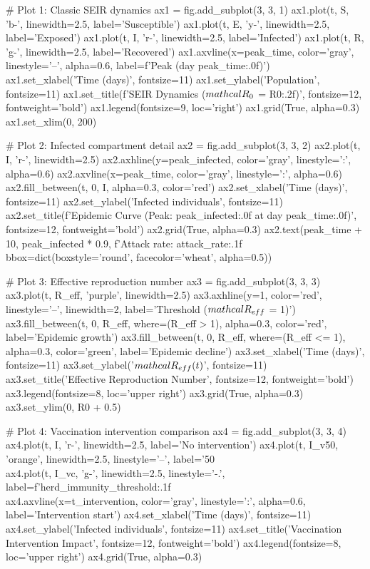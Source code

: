 \documentclass[a4paper, 11pt]{article}
\begin{document}
\begin{pycode}
# Plot 1: Classic SEIR dynamics
ax1 = fig.add_subplot(3, 3, 1)
ax1.plot(t, S, 'b-', linewidth=2.5, label='Susceptible')
ax1.plot(t, E, 'y-', linewidth=2.5, label='Exposed')
ax1.plot(t, I, 'r-', linewidth=2.5, label='Infected')
ax1.plot(t, R, 'g-', linewidth=2.5, label='Recovered')
ax1.axvline(x=peak_time, color='gray', linestyle='--', alpha=0.6, label=f'Peak (day {peak_time:.0f})')
ax1.set_xlabel('Time (days)', fontsize=11)
ax1.set_ylabel('Population', fontsize=11)
ax1.set_title(f'SEIR Dynamics ($\\mathcal{{R}}_0$ = {R0:.2f})', fontsize=12, fontweight='bold')
ax1.legend(fontsize=9, loc='right')
ax1.grid(True, alpha=0.3)
ax1.set_xlim(0, 200)

# Plot 2: Infected compartment detail
ax2 = fig.add_subplot(3, 3, 2)
ax2.plot(t, I, 'r-', linewidth=2.5)
ax2.axhline(y=peak_infected, color='gray', linestyle=':', alpha=0.6)
ax2.axvline(x=peak_time, color='gray', linestyle=':', alpha=0.6)
ax2.fill_between(t, 0, I, alpha=0.3, color='red')
ax2.set_xlabel('Time (days)', fontsize=11)
ax2.set_ylabel('Infected individuals', fontsize=11)
ax2.set_title(f'Epidemic Curve (Peak: {peak_infected:.0f} at day {peak_time:.0f})',
              fontsize=12, fontweight='bold')
ax2.grid(True, alpha=0.3)
ax2.text(peak_time + 10, peak_infected * 0.9,
         f'Attack rate: {attack_rate:.1f}\\%
         bbox=dict(boxstyle='round', facecolor='wheat', alpha=0.5))

# Plot 3: Effective reproduction number
ax3 = fig.add_subplot(3, 3, 3)
ax3.plot(t, R_eff, 'purple', linewidth=2.5)
ax3.axhline(y=1, color='red', linestyle='--', linewidth=2, label='Threshold ($\\mathcal{R}_{eff}$ = 1)')
ax3.fill_between(t, 0, R_eff, where=(R_eff > 1), alpha=0.3, color='red', label='Epidemic growth')
ax3.fill_between(t, 0, R_eff, where=(R_eff <= 1), alpha=0.3, color='green', label='Epidemic decline')
ax3.set_xlabel('Time (days)', fontsize=11)
ax3.set_ylabel('$\\mathcal{R}_{eff}(t)$', fontsize=11)
ax3.set_title('Effective Reproduction Number', fontsize=12, fontweight='bold')
ax3.legend(fontsize=8, loc='upper right')
ax3.grid(True, alpha=0.3)
ax3.set_ylim(0, R0 + 0.5)

# Plot 4: Vaccination intervention comparison
ax4 = fig.add_subplot(3, 3, 4)
ax4.plot(t, I, 'r-', linewidth=2.5, label='No intervention')
ax4.plot(t, I_v50, 'orange', linewidth=2.5, linestyle='--', label='50\\%
ax4.plot(t, I_vc, 'g-', linewidth=2.5, linestyle='-.', label=f'{herd_immunity_threshold:.1f}\\%
ax4.axvline(x=t_intervention, color='gray', linestyle=':', alpha=0.6, label='Intervention start')
ax4.set_xlabel('Time (days)', fontsize=11)
ax4.set_ylabel('Infected individuals', fontsize=11)
ax4.set_title('Vaccination Intervention Impact', fontsize=12, fontweight='bold')
ax4.legend(fontsize=8, loc='upper right')
ax4.grid(True, alpha=0.3)


\end{pycode}
\end{document}

